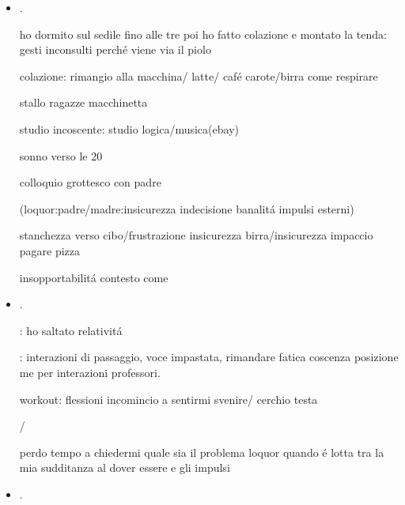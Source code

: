 \begin{itemize}
impotenza violenza

la sonnolenza stanchezza loquor insicuro/incoscente prosegue a pranzo alla pam e alla macchinetta del caf\'e

studio con lentezza come 

workout con fatica: impacciato nei movimenti/ loquor minaccia/rassegnazione


\item {}.

ho dormito sul sedile fino alle tre poi ho fatto colazione e montato la tenda: gesti inconsulti perch\'e viene via il piolo

colazione: rimangio alla macchina/ latte/ caf\'e carote/birra come respirare

stallo ragazze macchinetta

studio incoscente: studio logica/musica(ebay)

sonno verso le 20

colloquio grottesco con padre

(loquor:padre/madre:insicurezza indecisione banalit\'a impulsi esterni)

stanchezza verso cibo/frustrazione insicurezza birra/insicurezza impaccio pagare pizza

insopportabilit\'a contesto come 

\item {}.

: ho saltato relativit\'a

: interazioni di passaggio, voce impastata,  rimandare fatica coscenza posizione me per interazioni professori.


workout: flessioni incomincio a sentirmi svenire/ cerchio testa

/

perdo tempo a chiedermi quale sia il problema loquor quando \'e lotta tra la mia sudditanza al dover essere e gli impulsi

\item {}\DTMusedate{}.


\end{itemize}
